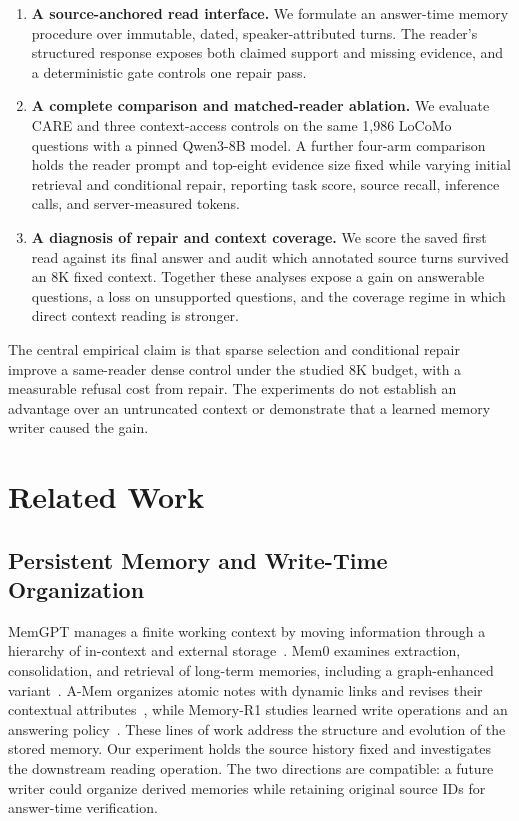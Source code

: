 \documentclass[11pt]{article}
\newcommand{\care}{\textsc{CARE}}
\begin{document}
\begin{enumerate}
  \item \textbf{A source-anchored read interface.} We formulate an answer-time
  memory procedure over immutable, dated, speaker-attributed turns. The
  reader's structured response exposes both claimed support and missing
  evidence, and a deterministic gate controls one repair pass.
  \item \textbf{A complete comparison and matched-reader ablation.} We evaluate
  \care{} and three context-access controls on the same 1,986 LoCoMo
  questions with a pinned Qwen3-8B model. A further four-arm comparison
  holds the reader prompt and top-eight evidence size fixed while varying
  initial retrieval and conditional repair, reporting task score, source
  recall, inference calls, and server-measured tokens.
  \item \textbf{A diagnosis of repair and context coverage.} We score the
  saved first read against its final answer and audit which annotated source
  turns survived an 8K fixed context. Together these analyses expose a gain
  on answerable questions, a loss on unsupported questions, and the coverage
  regime in which direct context reading is stronger.
\end{enumerate}

The central empirical claim is that sparse selection and conditional repair
improve a same-reader dense control under the studied 8K budget, with a
measurable refusal cost from repair. The experiments do not establish an
advantage over an untruncated context or demonstrate that a learned memory
writer caused the gain.

\section{Related Work}
\label{sec:related}

\subsection{Persistent Memory and Write-Time Organization}

MemGPT manages a finite working context by moving information through a
hierarchy of in-context and external storage~\cite{packer2023memgpt}.
Mem0 examines extraction, consolidation, and retrieval of long-term
memories, including a graph-enhanced variant~\cite{chhikara2025mem0}.
A-Mem organizes atomic notes with dynamic links and revises their contextual
attributes~\cite{amem2025}, while Memory-R1 studies learned write operations
and an answering policy~\cite{memoryr12025}. These lines of work address
the structure and evolution of the stored memory. Our experiment holds the
source history fixed and investigates the downstream reading operation.
The two directions are compatible: a future writer could organize derived
memories while retaining original source IDs for answer-time verification.
\end{document}
